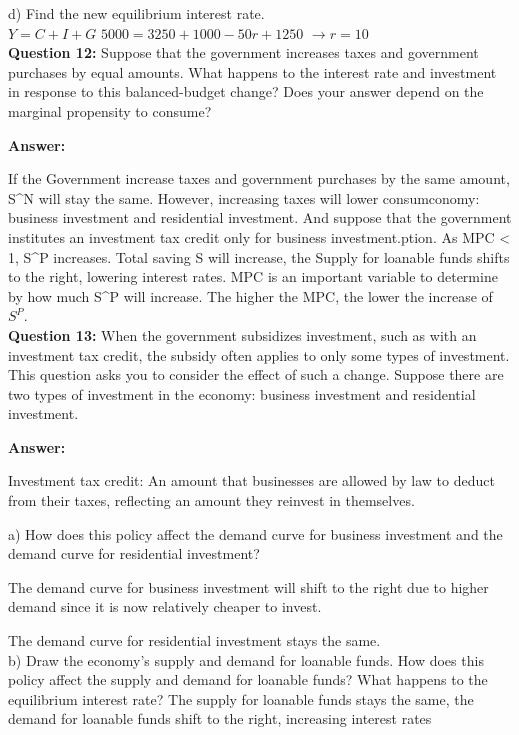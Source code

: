 \documentclass[a4paper, 11pt]{article}
\begin{document}
d) Find the new equilibrium interest rate.\\
$Y = C + I + G$
$5000 = 3250 + 1000 - 50r + 1250$
$\rightarrow r = 10$ 
\\

\textbf{Question 12:} Suppose that the government increases taxes and government purchases by equal amounts. What happens to the interest rate and investment in response to this balanced-budget change? Does your answer depend on the marginal propensity to consume?

\textbf{Answer:} 

If the Government increase taxes and government purchases by the same amount, S^{N} will stay the same. However, increasing taxes will lower consumconomy: business investment and residential investment. And suppose that the government institutes an investment tax credit only for business investment.ption. As MPC < 1, S^{P} increases. Total saving S will increase, the Supply for loanable funds shifts to the right, lowering interest rates. MPC is an important variable to determine by how much S^{P} will increase. The higher the MPC, the lower the increase of $S^{P}$. \\

\textbf{Question 13:} When the government subsidizes investment, such as with an investment tax credit, the subsidy often applies to only some types of investment. This question asks you to consider the effect of such a change. Suppose there are two types of investment in the economy: business investment and residential investment.


\textbf{Answer:}

Investment tax credit: An amount that businesses are allowed by law to deduct from their taxes, reflecting an amount they reinvest in themselves.

a) How does this policy affect the demand curve for business investment and the demand curve for residential investment?

The demand curve for business investment will shift to the right due to higher demand since it is now relatively cheaper to invest.

The demand curve for residential investment stays the same. \\

b) Draw the economy’s supply and demand for loanable funds. How does this policy affect the supply and demand for loanable funds? What happens to the equilibrium interest rate?
The supply for loanable funds stays the same, the demand for loanable funds shift to the right, increasing interest rates \\
\end{document}
